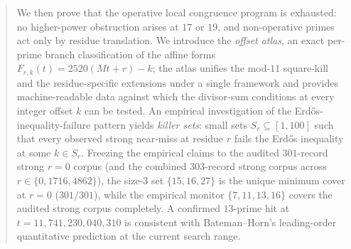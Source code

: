 \documentclass[11pt]{article}
\renewcommand{\_}{\origunderscore\allowbreak}
\theoremstyle{definition}
\theoremstyle{remark}
\begin{document}
\begin{abstract}
We then prove that the operative local congruence program is
exhausted: no higher-power obstruction arises at $17$ or $19$, and
non-operative primes act only by residue translation. We introduce
the \emph{offset atlas}, an exact per-prime branch classification
of the affine forms $F_{r,k}(t)=2520(Mt+r)-k$; the atlas unifies
the mod-$11$ square-kill and the residue-specific extensions under
a single framework and provides machine-readable data against
which the divisor-sum conditions at every integer offset $k$ can
be tested. An empirical investigation of the
Erd\H{o}s-inequality-failure pattern yields \emph{killer sets}:
small sets $S_r\subseteq[1,100]$ such that every observed
strong near-miss at residue $r$ fails the Erd\H{o}s inequality
at some $k\in S_r$. Freezing the empirical claims to the audited
$301$-record strong $r=0$ corpus (and the combined $303$-record
strong corpus across $r\in\{0,1716,4862\}$), the size-$3$ set
$\{15,16,27\}$ is the unique minimum cover at $r=0$ ($301/301$),
while the empirical monitor $\{7,11,13,16\}$ covers the audited
strong corpus completely. A confirmed $13$-prime hit at
$t=11{,}741{,}230{,}040{,}310$ is consistent with
Bateman--Horn's leading-order quantitative prediction at the current
search range.


\end{abstract}
\end{document}
